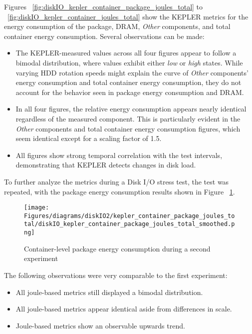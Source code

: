 Figures ~\ref{fig:diskIO_kepler_container_package_joules_total} to ~\ref{fig:diskIO_kepler_container_joules_total} show the KEPLER metrics for the energy consumption of the package, DRAM, \textit{Other} components, and total container energy consumption. Several observations can be made:
\begin{itemize}
    \item The KEPLER-measured values across all four figures appear to follow a bimodal distribution, where values exhibit either \textit{low} or \textit{high} states. While varying HDD rotation speeds might explain the curve of \textit{Other} components' energy consumption and total container energy consumption, they do not account for the behavior seen in package energy consumption and DRAM.
    \item In all four figures, the relative energy consumption appears nearly identical regardless of the measured component. This is particularly evident in the \textit{Other} components and total container energy consumption figures, which seem identical except for a scaling factor of 1.5.
    \item All figures show strong temporal correlation with the test intervals, demonstrating that KEPLER detects changes in disk load.
\end{itemize}

To further analyze the metrics during a Disk I/O stress test, the test was repeated, with the package energy consumption results shown in Figure ~\ref{fig:diskIO_kepler_container_cpu_joules_total_second_experiment}.

\begin{figure}[H]
    \centering
    \texttt{[image: Figures/diagrams/diskIO2/kepler\_container\_package\_joules\_total/diskIO\_kepler\_container\_package\_joules\_total\_smoothed.png]}
    \caption[Container Package Energy]{Container-level package energy consumption during a second experiment}
    \label{fig:diskIO_kepler_container_cpu_joules_total_second_experiment}
\end{figure}

The following observations were very comparable to the first experiment:

\begin{itemize}
\item All joule-based metrics still displayed a bimodal distribution.
\item All joule-based metrics appear identical aside from differences in scale.
\item Joule-based metrics show an observable upwards trend.
\end{itemize}

